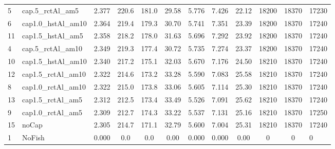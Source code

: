 \documentclass[11pt]{book}
\begin{document}
\begin{landscape}
\begin{longtable}[t]{llcccccccccl}
5 & cap.5\_rctAl\_am5 & 2.377 & 220.6 & 181.0 & 29.58 & 5.776 & 7.426 & 22.12 & 18200 & 18370 & 17230\\
6 & cap1.0\_hstAl\_am10 & 2.364 & 219.4 & 179.3 & 30.70 & 5.741 & 7.351 & 23.39 & 18200 & 18370 & 17240\\
11 & cap1.5\_hstAl\_am5 & 2.358 & 218.2 & 178.0 & 31.63 & 5.696 & 7.292 & 23.92 & 18200 & 18370 & 17240\\
4 & cap.5\_rctAl\_am10 & 2.349 & 219.3 & 177.4 & 30.72 & 5.735 & 7.274 & 23.37 & 18200 & 18370 & 17240\\
10 & cap1.5\_hstAl\_am10 & 2.340 & 217.2 & 175.1 & 32.03 & 5.670 & 7.176 & 24.50 & 18210 & 18370 & 17240\\
12 & cap1.5\_rctAl\_am10 & 2.322 & 214.6 & 173.2 & 33.28 & 5.590 & 7.083 & 25.58 & 18210 & 18370 & 17240\\
8 & cap1.0\_rctAl\_am10 & 2.322 & 215.0 & 173.8 & 33.06 & 5.605 & 7.114 & 25.30 & 18210 & 18370 & 17240\\
13 & cap1.5\_rctAl\_am5 & 2.312 & 212.5 & 173.4 & 33.49 & 5.526 & 7.091 & 25.62 & 18210 & 18370 & 17240\\
9 & cap1.0\_rctAl\_am5 & 2.309 & 212.7 & 174.3 & 33.22 & 5.537 & 7.131 & 25.16 & 18210 & 18370 & 17250\\
15 & noCap & 2.305 & 214.7 & 171.1 & 32.79 & 5.600 & 7.004 & 25.31 & 18210 & 18370 & 17240\\
1 & NoFish & 0.000 & 0.0 & 0.0 & 0.00 & 0.000 & 0.000 & 0.00 & 0 & 0 & 0\\*
\end{longtable}
\end{landscape}
\endgroup{}

\newpage
\end{document}
